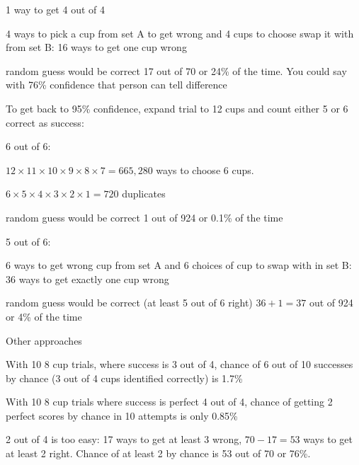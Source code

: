 \documentclass[landscape]{exam}
\begin{document}
  \begin{itemize*}
    \item 1 way to get 4 out of 4
    \item 4 ways to pick a cup from set A to get wrong and 4 cups to choose swap
      it with from set B\@: 16 ways to get one cup wrong
    \item random guess would be correct 17 out of 70 or 24\% of the time.  You
      could say with 76\% confidence that person can tell difference
  \end{itemize*}

  To get back to 95\% confidence, expand trial to 12 cups and count either 5 or
  6 correct as success:

  6 out of 6:
  \begin{itemize*}
    \item $12 \times 11 \times 10 \times 9 \times 8 \times 7 = 665,280$ ways to
      choose 6 cups.  
    \item $6 \times 5 \times 4 \times 3 \times 2 \times 1 = 720$ duplicates
    \item random guess would be correct 1 out of 924 or 0.1\% of the time
  \end{itemize*}

  5 out of 6:
  \begin{itemize*}
    \item 6 ways to get wrong cup from set A and 6 choices of cup to swap with
      in set B\@: 36 ways to get exactly one cup wrong
    \item random guess would be correct (at least 5 out of 6 right) $36 + 1 =
      37$ out of 924 or 4\% of the time
  \end{itemize*}

  Other approaches
  \begin{itemize*}
    \item With 10 8 cup trials, where success is 3 out of 4, chance of 6 out of
      10 successes by chance (3 out of 4 cups identified correctly) is 1.7\%
      
    \item With 10 8 cup trials where success is perfect 4 out of 4, chance of
      getting 2 perfect scores by chance in 10 attempts is only 0.85\%
  \end{itemize*}

  2 out of 4 is too easy: 17 ways to get at least 3 wrong, $70 - 17 = 53$ ways
  to get at least 2 right.  Chance of at least 2 by chance is 53 out of 70 or
  76\%.
\end{document}

